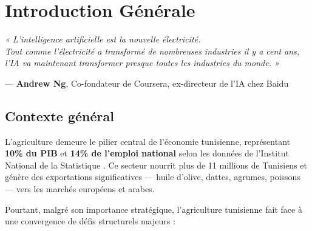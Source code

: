 \chapter{Introduction Générale}
\thispagestyle{fancy}

\begin{tcolorbox}[technote, title={Épigraphe}]
\itshape
« L'intelligence artificielle est la nouvelle électricité.\\
Tout comme l'électricité a transformé de nombreuses industries il y a cent ans,\\
l'IA va maintenant transformer presque toutes les industries du monde. »
\begin{flushright}
\upshape— \textbf{Andrew Ng}, Co-fondateur de Coursera, ex-directeur de l'IA chez Baidu
\end{flushright}
\end{tcolorbox}

\section{Contexte général}

L'agriculture demeure le pilier central de l'économie tunisienne, représentant
\textbf{10\% du PIB} et \textbf{14\% de l'emploi national} selon les données de
l'Institut National de la Statistique \cite{ins_tunisie_2023}. Ce secteur nourrit plus de
11 millions de Tunisiens et génère des exportations significatives — huile d'olive,
dattes, agrumes, poissons — vers les marchés européens et arabes.

Pourtant, malgré son importance stratégique, l'agriculture tunisienne fait face à une
convergence de défis structurels majeurs :

